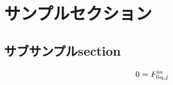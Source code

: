 \documentclass[autodetect-engine,dvipdfmx-if-dvi,ja=standard]{jsarticle}
\begin{document}
\section{サンプルセクション}
\subsection{サブサンプルsection}
    \begin{equation}\nonumber
        0=F^{{\rm in}}_{{\rm liq},j}
    \end{equation}
\end{document}
